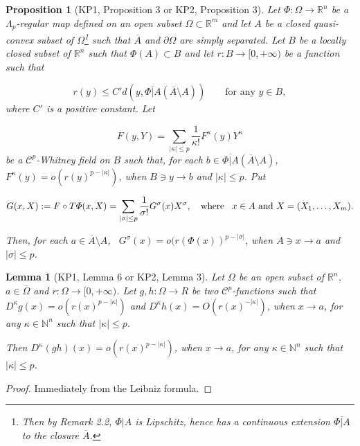 \documentclass[12pt]{amsart}
\newtheorem{lem}[thm]{Lemma}
\newtheorem{prop}[thm]{Proposition}
\theoremstyle{definition}
\theoremstyle{remark}
\numberwithin{equation}{section}
\newcommand{\Real}{\mathbb R}
\begin{document}
\bigskip
\begin{prop}[\lbrack KP1, Proposition 3 or KP2, Proposition 3\rbrack] Let $\varPhi:\varOmega\longrightarrow {\mathbb R}^n$ be a $\varLambda_p$-regular map defined on an open subset $\varOmega\subset {\mathbb R}^m$ and let $A$ be a closed quasi-convex subset of $\varOmega$\footnote{Then by Remark 2.2, $\varPhi|A$ is Lipschitz, hence has a continuous extension $\overline{\varPhi|A}$ to the closure $\overline{A}$.} such that $\overline{A}$ and $\partial\varOmega$ are simply separated. Let $B$ be a locally closed subset of $\Real^n$ such that $\varPhi(A)\subset B$ and let $r: B\longrightarrow [0, +\infty)$ be a  function such that

$$
r(y)\leq C'd(y, \overline{\varPhi|A}(\overline{A}\setminus A)) \qquad\text{for any $y\in B$},
$$
where $C'$ is a positive constant. Let

$$
F(y, Y) = \sum_{|\kappa|\leq p}\frac{1}{\kappa!} F^{\kappa}(y)Y^{\kappa}
$$
be a $\mathcal{C}^p$-Whitney field on $B$ such that, for each $b\in \overline{\varPhi|A}(\overline{A}\setminus A)$, $F^\kappa(y) = o(r(y)^{p-|\kappa|})$,
when $B\ni y\rightarrow b$ and $|\kappa|\leq p$. Put

$$
G(x, X):= F\circ T\varPhi(x, X)= \sum_{|\sigma|\leq p}\frac{1}{\sigma!}G^\sigma(x)X^\sigma, \quad\text{where \, $x\in A$ and $X = (X_1,\dots,X_m)$}.
$$

\medskip
Then, for each $a\in \overline{A}\setminus A$, \, $G^\sigma(x) = o(r(\varPhi(x))^{p-|\sigma|}$, when $A\ni x\rightarrow a$ and $|\sigma|\leq p$.
\end{prop}



\medskip
\begin{lem} [\lbrack KP1, Lemma 6 or KP2, Lemma 3\rbrack] Let $\varOmega$ be an open subset of $\Real^n$, $a\in \overline{\varOmega}$ and $r:\varOmega\longrightarrow [0, +\infty)$.
Let $g, h: \varOmega\longrightarrow R$ be two $\mathcal{C}^p$-functions such that $D^{\kappa}g(x) = o(r(x)^{p-|\kappa|})$ and $D^{\kappa}h(x) = O(r(x)^{-|\kappa|})$, when $x\rightarrow a$, for any $\kappa\in \mathbb{N}^n$ such that $|\kappa|\leq p$.

\medskip
Then $D^{\kappa}(gh)(x) = o(r(x)^{p-|\kappa|})$, when $x\rightarrow a$, for any $\kappa\in \mathbb{N}^n$ such that $|\kappa|\leq p$.
\end{lem}

\begin{proof} Immediately from the Leibniz formula.
\end{proof}
\end{document}
